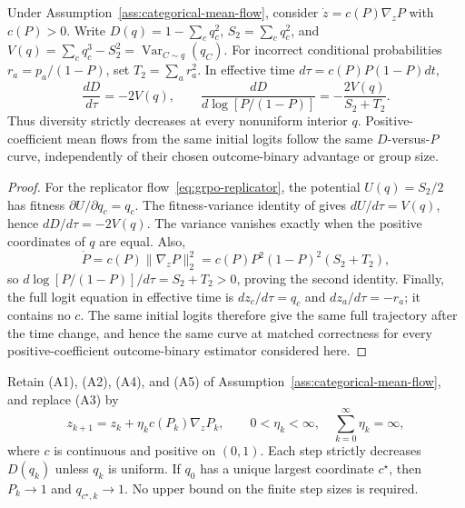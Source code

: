 \begin{proposition}
\enforcehalffinalproseline
\label{prop:pcmd-drift}
Under Assumption~\ref{ass:categorical-mean-flow}, consider
$\dot z=c(P)\nabla_zP$ with $c(P)>0$. Write
$D(q)=1-\sum_cq_c^2$, $S_2=\sum_cq_c^2$, and
$V(q)=\sum_cq_c^3-S_2^2=\operatorname{Var}_{C\sim q}(q_C)$.
For incorrect conditional probabilities $r_a=p_a/(1-P)$, set
$T_2=\sum_ar_a^2$. In effective time $d\tau=c(P)P(1-P)dt$,
\begin{equation}
 \frac{dD}{d\tau}=-2V(q),
 \qquad
 \frac{dD}{d\log[P/(1-P)]}
 =-\frac{2V(q)}{S_2+T_2}.
 \label{eq:pcmd-drift}
\end{equation}
Thus diversity strictly decreases at every nonuniform interior $q$.
Positive-coefficient mean flows from the same initial logits follow the same
$D$-versus-$P$ curve, independently of their chosen outcome-binary advantage or
group size.
\end{proposition}

\begin{proof}
\enforcehalffinalproseline
For the replicator flow~\eqref{eq:grpo-replicator}, the potential
$U(q)=S_2/2$ has fitness $\partial U/\partial q_c=q_c$.
The fitness-variance identity of
\citet[Theorems~1--2]{harper2009informationgeometry} gives
$dU/d\tau=V(q)$, hence $dD/d\tau=-2V(q)$.
The variance vanishes exactly when the
positive coordinates of $q$ are equal. Also,
\[
 \dot P=c(P)\|\nabla_zP\|_2^2
       =c(P)P^2(1-P)^2(S_2+T_2),
\]
so $d\log[P/(1-P)]/d\tau=S_2+T_2>0$, proving the second identity.
Finally, the full logit equation in effective time is
$dz_c/d\tau=q_c$ and $dz_a/d\tau=-r_a$; it contains no $c$.
The same initial logits therefore give the same full trajectory after the
time change, and hence the same curve at matched correctness for every positive-coefficient outcome-binary estimator considered here.
\end{proof}

\begin{theorem}
\enforcehalffinalproseline
\label{thm:finite-expected-steps}
Retain (A1), (A2), (A4), and (A5) of
Assumption~\ref{ass:categorical-mean-flow}, and replace (A3) by
\begin{equation}
 z_{k+1}=z_k+\eta_k c(P_k)\nabla_zP_k,
 \qquad 0<\eta_k<\infty,\quad \sum_{k=0}^\infty\eta_k=\infty,
 \label{eq:finite-expected-update}
\end{equation}
where $c$ is continuous and positive on $(0,1)$. Each step strictly decreases
$D(q_k)$ unless $q_k$ is uniform. If $q_0$ has a unique largest coordinate
$c^\star$, then $P_k\to1$ and $q_{c^\star,k}\to1$.
No upper bound on the finite step sizes is required.
\end{theorem}

